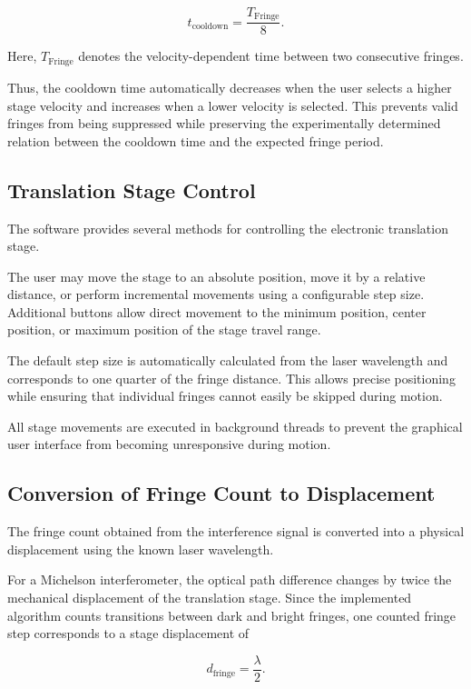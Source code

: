 \begin{equation}
t_{\text{cooldown}}
=
\frac{T_{\text{Fringe}}}{8}.
\end{equation}

Here, \(T_{\text{Fringe}}\) denotes the velocity-dependent time between two consecutive fringes.

Thus, the cooldown time automatically decreases when the user selects a higher stage velocity and increases when a lower velocity is selected. This prevents valid fringes from being suppressed while preserving the experimentally determined relation between the cooldown time and the expected fringe period.

\subsection{Translation Stage Control}

The software provides several methods for controlling the electronic translation stage.

The user may move the stage to an absolute position, move it by a relative distance, or perform incremental movements using a configurable step size. Additional buttons allow direct movement to the minimum position, center position, or maximum position of the stage travel range.

The default step size is automatically calculated from the laser wavelength and corresponds to one quarter of the fringe distance. This allows precise positioning while ensuring that individual fringes cannot easily be skipped during motion.

All stage movements are executed in background threads to prevent the graphical user interface from becoming unresponsive during motion.

\subsection{Conversion of Fringe Count to Displacement}

The fringe count obtained from the interference signal is converted into a physical displacement using the known laser wavelength.

For a Michelson interferometer, the optical path difference changes by twice the mechanical displacement of the translation stage. Since the implemented algorithm counts transitions between dark and bright fringes, one counted fringe step corresponds to a stage displacement of

\begin{equation}
d_{\mathrm{fringe}}
=
\frac{\lambda}{2}.
\end{equation}

